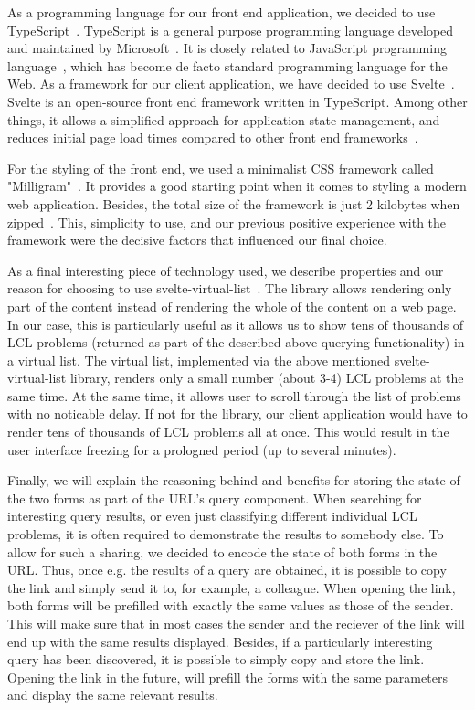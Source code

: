 As a programming language for our front end application, we decided
to use TypeScript~\cite{FiXMEs}. TypeScript is a general purpose
programming language developed and maintained by Microsoft~\cite{FIXME}. It is closely related to JavaScript programming language~\cite{FIXME}, which has become de facto standard programming language for the Web.
As a framework for our client application, we have decided to use
Svelte~\cite{FIXME}. Svelte is an open-source front end framework
written in TypeScript. Among other things, it allows a simplified
approach for application state management, and reduces initial
page load times compared to other front end frameworks~\cite{FIXME}.

For the styling of the front end, we used a minimalist CSS framework
called "Milligram"~\cite{FIXME}. It provides a good starting point
when it comes to styling a modern web application. Besides, the total
size of the framework is just 2 kilobytes when zipped~\cite{FIXME}.
This, simplicity to use, and our previous positive experience with
the framework were the decisive factors that influenced our final
choice.

As a final interesting piece of technology used, we describe properties
and our reason for choosing to use svelte-virtual-list~\cite{FIXME}.
The library allows rendering only part of the content instead of rendering
the whole of the content on a web page. In our case, this is
particularly useful as it allows us to
show tens of thousands of LCL problems (returned as part of the described above querying functionality) in a virtual list.
The virtual list, implemented via the above mentioned svelte-virtual-list library, renders only a small number (about 3-4)
LCL problems at the same time. At the same time, it allows user to
scroll through the list of problems with no noticable delay.
If not for the library, our client application would have to render
tens of thousands of LCL problems all at once. This would result in
the user interface freezing for a prologned period (up to several minutes).

Finally, we will explain the reasoning behind and benefits for
storing the state of the two forms as part of the URL's query
component. When searching for interesting query results, or even
just classifying different individual LCL problems, it is often
required to demonstrate the results to somebody else. To allow for such
a sharing, we decided to encode the state of both forms in the URL.
Thus, once e.g. the results of a query are obtained, it is possible
to copy the link and simply send it to, for example, a colleague.
When opening the link, both forms will be prefilled with
exactly the same values as those of the sender. This will make sure
that in most cases the sender and the reciever of the link will end
up with the same results displayed. Besides, if a particularly
interesting query has been discovered, it is possible to
simply copy and store the link. Opening the link in the future,
will prefill the forms with the same parameters and display
the same relevant results.


